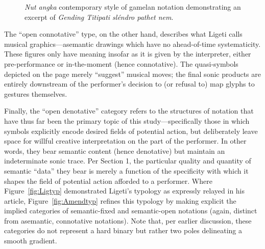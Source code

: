     \begin{figure}
        \centering
        \captionsetup{width=.5\textwidth}
        \caption[\textit{Nut angka} contemporary style of gamelan notation demonstrating an excerpt of \textit{Gending Titipati sléndro pathet nem}.]{\textit{Nut angka} contemporary style of gamelan notation demonstrating an excerpt of \textit{Gending Titipati sléndro pathet nem}.\footnotemark}
        \label{fig:gamelannot}
    \end{figure}

    The ``open connotative'' type, on the other hand, describes what Ligeti calls musical graphics---asemantic drawings which have no ahead-of-time systematicity. These figures only have meaning insofar as it is given by the interpreter, either pre-performance or in-the-moment (hence connotative). The quasi-symbols depicted on the page merely ``suggest'' musical moves; the final sonic products are entirely downstream of the performer's decision to (or refusal to) map glyphs to gestures themselves.
    
    
    Finally, the ``open denotative'' category refers to the structures of notation that have thus far been the primary topic of this study---specifically those in which symbols explicitly encode desired fields of potential action, but deliberately leave space for willful creative interpretation on the part of the performer. In other words, they bear semantic content (hence denotative) but maintain an indeterminate sonic trace. Per Section 1, the particular quality and quantity of semantic ``data'' they bear is merely a function of the specificity with which it shapes the field of potential action afforded to a performer. Where Figure~\ref{fig:Ligtyp} demonstrated Ligeti's typology as expressly relayed in his article, Figure~\ref{fig:Amendtyp} refines this typology by making explicit the implied categories of semantic-fixed and semantic-open notations (again, distinct from asemantic, connotative notations). Note that, per earlier discussion, these categories do not represent a hard binary but rather two poles delineating a smooth gradient.


